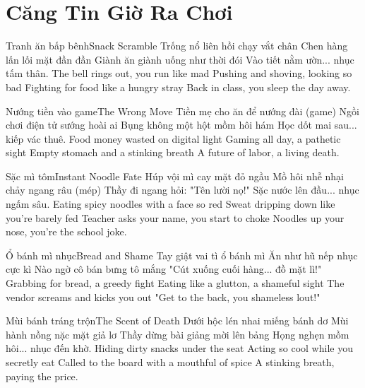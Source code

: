 \chapter{Căng Tin Giờ Ra Chơi}

\begin{tutuyetbox}{Tranh ăn bấp bênh}{Snack Scramble}
Trống nổ liên hồi chạy vắt chân
Chen hàng lấn lối mặt đần đần
Giành ăn giành uống như thời đói
Vào tiết nằm ườn... nhục tấm thân.
\tcblower
The bell rings out, you run like mad 
Pushing and shoving, looking so bad 
Fighting for food like a hungry stray 
Back in class, you sleep the day away.
\end{tutuyetbox}

\begin{tutuyetbox}{Nướng tiền vào game}{The Wrong Move}
Tiền mẹ cho ăn để nướng đài (game)
Ngồi chơi điện tử sướng hoài ai
Bụng không một hột mồm hôi hám
Học dốt mai sau... kiếp vác thuê.
\tcblower
Food money wasted on digital light 
Gaming all day, a pathetic sight 
Empty stomach and a stinking breath 
A future of labor, a living death.
\end{tutuyetbox}

\begin{tutuyetbox}{Sặc mì tôm}{Instant Noodle Fate}
Húp vội mì cay mặt đỏ ngầu
Mồ hôi nhễ nhại chảy ngang râu (mép)
Thầy đi ngang hỏi: "Tên lười nọ!"
Sặc nước lên đầu... nhục ngấm sâu.
\tcblower
Eating spicy noodles with a face so red 
Sweat dripping down like you're barely fed 
Teacher asks your name, you start to choke 
Noodles up your nose, you're the school joke.
\end{tutuyetbox}

\begin{tutuyetbox}{Ổ bánh mì nhục}{Bread and Shame}
Tay giật vai tì ổ bánh mì
Ăn như hũ nếp nhục cực kì
Nào ngờ cô bán bưng tô mắng
"Cút xuống cuối hàng... đồ mặt lì!"
\tcblower
Grabbing for bread, a greedy fight 
Eating like a glutton, a shameful sight 
The vendor screams and kicks you out 
"Get to the back, you shameless lout!"
\end{tutuyetbox}

\begin{tutuyetbox}{Mùi bánh tráng trộn}{The Scent of Death}
Dưới hộc lén nhai miếng bánh dơ
Mùi hành nồng nặc mặt giả lơ
Thầy dừng bài giảng mời lên bảng
Họng nghẹn mồm hôi... nhục đến khờ.
\tcblower
Hiding dirty snacks under the seat 
Acting so cool while you secretly eat 
Called to the board with a mouthful of spice 
A stinking breath, paying the price.
\end{tutuyetbox}

